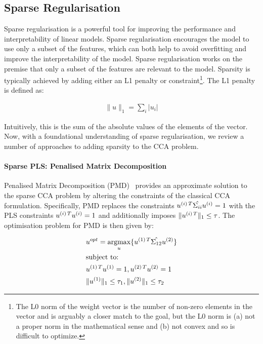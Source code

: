 \subsection{Sparse Regularisation}

Sparse regularisation is a powerful tool for improving the performance and interpretability of linear models.
Sparse regularisation encourages the model to use only a subset of the features, which can both help to avoid overfitting and improve the interpretability of the model.
Sparse regularisation works on the premise that only a subset of the features are relevant to the model.
Sparsity is typically achieved by adding either an L1 penalty or constraint\footnote{The L0 norm of the weight vector is the number of non-zero elements in the vector and is arguably a closer match to the goal, but the L0 norm is (a) not a proper norm in the mathematical sense and (b) not convex and so is difficult to optimize.}.
The L1 penalty is defined as:

\begin{align}
    \|u\|_1 = \sum_i |u_i|
\end{align}

Intuitively, this is the sum of the absolute values of the elements of the vector.
Now, with a foundational understanding of sparse regularisation, we review a number of approaches to adding sparsity to the CCA problem.

\paragraph{Sparse PLS: Penalised Matrix Decomposition}
Penalised Matrix Decomposition (PMD)~\citep{witten2009penalised} provides an approximate solution to the sparse CCA problem by altering the constraints of the classical CCA formulation.
Specifically, PMD replaces the constraints \(u^{(i)\,T} \hat{\Sigma_{ii}} u^{(i)} = 1\) with the PLS constraints \(u^{(i)\,T} u^{(i)}= 1\) and additionally imposes \(\|u^{(i)\,T}\|_1 \leq \tau\).
The optimisation problem for PMD is then given by:

\begin{align}
    & u^{opt}=\underset{u}{\mathrm{argmax}}\{ u^{(1)\,T} \hat{\Sigma_{12}} u^{(2)} \} \\
    & \text{subject to:} \notag \\
    & u^{(1)\,T} u^{(1)} = 1 , u^{(2)\,T} u^{(2)} = 1 \notag \\
    & \|u^{(1)}\|_1 \leq \tau_1 , \|u^{(2)}\|_1 \leq \tau_2 \notag
\end{align}

